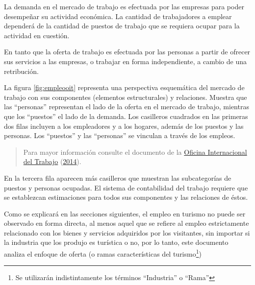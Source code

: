 \documentclass[
  openany]{book}
\begin{document}
La demanda en el mercado de trabajo es efectuada por las empresas para poder desempeñar su actividad económica. La cantidad de trabajadores a emplear dependerá de la cantidad de puestos de trabajo que se requiera ocupar para la actividad en cuestión.

En tanto que la oferta de trabajo es efectuada por las personas a partir de ofrecer sus servicios a las empresas, o trabajar en forma independiente, a cambio de una retribución.

La figura \ref{fig:empleooit} representa una perspectiva esquemática del mercado de trabajo con sus componentes (elementos estructurales) y relaciones. Muestra que las ``personas'' representan el lado de la oferta en el mercado de trabajo, mientras que los ``puestos'' el lado de la demanda. Los casilleros cuadrados en las primeras dos filas incluyen a los empleadores y a los hogares, además de los puestos y las personas. Los ``puestos'' y las ``personas'' se vinculan a través de los empleos.

\begin{quote}
Para mayor información consulte el documento de la \protect\hyperlink{ref-oitconferencia14}{Oficina Internacional del Trabajo} (\protect\hyperlink{ref-oitconferencia14}{2014}).
\end{quote}

En la tercera fila aparecen más casilleros que muestran las subcategorías de puestos y personas ocupadas. El sistema de contabilidad del trabajo requiere que se establezcan estimaciones para todos sus componentes y las relaciones de éstos.

Como se explicará en las secciones siguientes, el empleo en turismo no puede ser observado en forma directa, al menos aquel que se refiere al empleo estrictamente relacionado con los bienes y servicios adquiridos por los visitantes, sin importar si la industria que los produjo es turística o no, por lo tanto, este documento analiza el enfoque de oferta (o ramas características del turismo\footnote{Se utilizarán indistintamente los términos ``Industria'' o ``Rama''})
\end{document}
